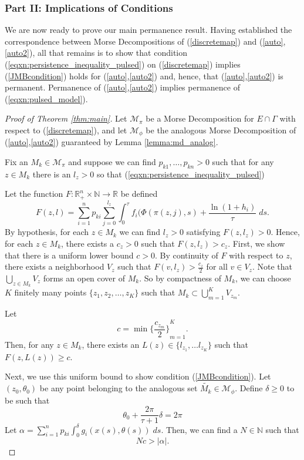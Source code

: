 \documentclass{article}
\theoremstyle{definition}
\newcommand{\R}{{\mathbb{R}}}
\newcommand{\N}{{\mathbb{N}}}
\newcommand{\eleanor}[1]{\textcolor{teal}{[EC: #1]}}
\begin{document}
\subsubsection{Part II: Implications of Conditions}
We are now ready to prove our main permanence result. Having established the correspondence between Morse Decompositions of (\ref{discretemap}) and (\ref{auto},\ref{auto2}), all that remains is to show that condition (\ref{eqxn:persistence_inequality_pulsed})  on (\ref{discretemap}) implies  (\ref{JMBcondition}) holds for (\ref{auto},\ref{auto2}) and, hence, that  (\ref{auto},\ref{auto2}) is permanent. Permanence of (\ref{auto},\ref{auto2}) implies permanence of (\ref{eqxn:pulsed_model}). 

\begin{proof}[Proof of Theorem \ref{thm:main}]
    Let $\mathcal{M}_\pi$ be a Morse Decomposition for $E\cap \Gamma$ with respect to (\ref{discretemap}), and let $\mathcal{M}_\phi$ be the analogous Morse Decomposition of (\ref{auto},\ref{auto2}) guaranteed by Lemma \ref{lemma:md_analog}. 

    Fix an $M_k \in \mathcal{M}_\pi$ and suppose we can find $p_{k1}, \ldots, p_{kn} > 0$ such that for any $z \in M_k$ there is an $l_z > 0$ so that (\ref{eqxn:persistence_inequality_pulsed}) 
    
   Let the function $F: \R^n_+ \times \N \to \R$ be defined
   $$
        F(z,l) = \sum^n_{i=1} p_{ki} \sum^{l_z}_{j=0}\int^{\tau}_0 f_i(\Phi(\pi(z,j), s) + \frac{\ln{(1+h_i)}}{\tau} \;ds.
   $$
  By hypothesis, for each $z \in M_k$ we can find $l_z > 0$ satisfying $F(z,l_z) > 0$.   Hence, for each $z\in M_k$, there exists a $c_z>0$ such that $F(z,l_z) > c_z$.  First, we show that there is a uniform lower bound $c>0$.  By continuity of $F$ with respect to $z$, there exists a neighborhood $V_z$ such that $F(v, l_z) > \frac{c_z}{2}$ for all $v \in V_z$. Note that $\bigcup_{z\in M_k} V_z$ forms an open cover of $M_k$. So by compactness of $M_k$, we can choose $K$ finitely many points $\{z_1, z_2, \ldots, z_K\}$ such that $M_k \subset \bigcup^K_{m=1} V_{z_m}$.

    Let 
    $$
        c = \min {\{\frac{c_{z_m}}{2}\}}_{m=1}^K.
    $$
    Then, for any $z \in M_k$, there exists an $L(z) \in \{l_{z_1},\ldots l_{z_K}\}$ such that $F(z,L(z)) \geq c$.

    Next, we use this uniform bound to show condition (\ref{JMBcondition}). Let $(z_0, \theta_0)$ be any point belonging to the analogous set $\tilde {M_k} \in \mathcal{M}_\phi$. Define $\delta \geq 0$ to be such that  
    $$
    \theta_0 + \frac{2\pi}{\tau + 1}\delta= 2\pi
    $$
    Let $\alpha=\sum^n_{i=1} p_{ki} \int_0^\delta g_i(x(s),\theta(s)) \; ds$. Then, we can find a $N \in \N$ such that
    $$
     Nc > |\alpha|.
    $$
   

\end{proof}
\end{document}
